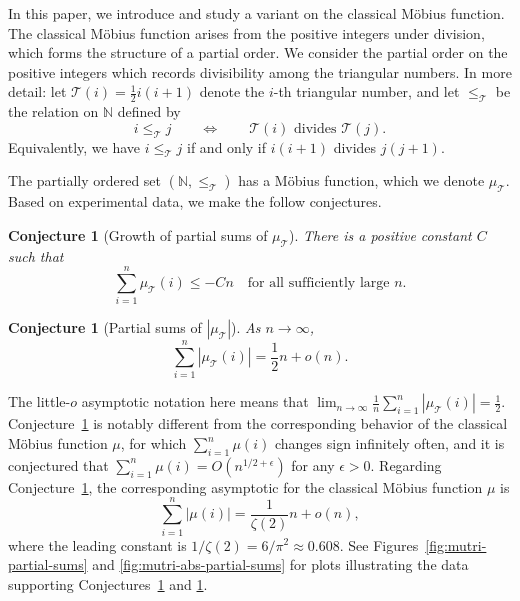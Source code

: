 \documentclass{amsart}
\newtheorem{conj}[thm]{Conjecture}
\theoremstyle{definition}
\newcommand{\NN}{\mathbb{N}}
\newcommand{\Mobius}{M\"obius}
\newcommand{\leqtri}{\leq_{\tri}}
\newcommand{\mutri}{\mu_{\tri}}
\newcommand{\tri}{\mathcal T}
\begin{document}
In this paper, we introduce and study a variant on the classical \Mobius{} function.
The classical \Mobius{} function arises from the positive integers under division, which forms the structure of a partial order.
We consider the partial order on the positive integers which records divisibility among the triangular numbers.
In more detail: let $\tri(i) = \frac12 i(i+1)$ denote the $i$-th triangular number,
and let $\leqtri$ be the relation on $\NN$ defined by
\[
    i \leqtri j 
    \qquad\Leftrightarrow\qquad
    \tri(i) \text{ divides } \tri(j) .
\]
Equivalently, we have
$i \leqtri j$ if and only if $i(i+1)$ divides $j(j+1)$.
 
The partially ordered set $(\NN, \leqtri)$ has a \Mobius{} function, which we denote $\mutri$.
Based on experimental data, we make the follow conjectures.

\begin{conj}[Growth of partial sums of $\mutri$]
\label{conj:mobius-sum}
There is a positive constant $C$ such that
\begin{equation*}
    \sum_{i=1}^n \mutri(i) \leq - C n \quad\text{for all sufficiently large } n.
\end{equation*}
\end{conj}

\begin{conj}[Partial sums of $|\mutri|$]
\label{conj:mobius-abs-sum}
As $n \to \infty$,
\begin{equation*}
    \sum_{i=1}^n |\mutri(i)| = \frac12 n + o(n).
\end{equation*}
\end{conj}
The little-$o$ asymptotic notation here means that $\lim_{n \to \infty} \frac{1}{n} \sum_{i=1}^n |\mutri(i)| = \frac12$.
Conjecture~\ref{conj:mobius-sum} is notably different from the corresponding behavior of the classical \Mobius{} function $\mu$, for which $\sum_{i=1}^n \mu(i)$ changes sign infinitely often,
and it is conjectured that $\sum_{i=1}^n \mu(i) = O(n^{1/2 + \epsilon})$ for any $\epsilon > 0$.
Regarding Conjecture~\ref{conj:mobius-abs-sum}, the corresponding asymptotic for the classical \Mobius{} function $\mu$ is
\[
    \sum_{i=1}^n |\mu(i)| = \frac{1}{\zeta(2)}n + o(n) ,
\]
where the leading constant is $1/\zeta(2) = {6}/{\pi^2} \approx 0.608$.
See Figures~\ref{fig:mutri-partial-sums} and \ref{fig:mutri-abs-partial-sums} for plots illustrating the data supporting Conjectures~\ref{conj:mobius-sum} and \ref{conj:mobius-abs-sum}.
\end{document}
